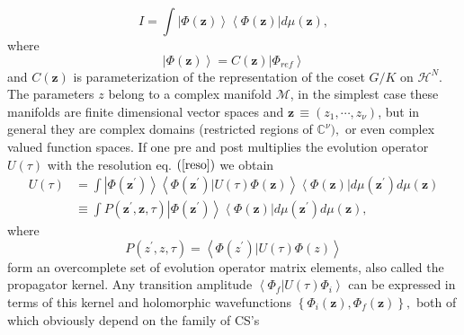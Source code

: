 \documentclass[aps,preprint]{revtex4}%
\begin{document}
\begin{equation}
I=\int\left\vert \Phi\left(  \mathbf{z}\right)  \right\rangle \left\langle
\Phi\left(  \mathbf{z}\right)  \right\vert d\mu\left(  \mathbf{z}\right)  ,
\label{reso}%
\end{equation}
where
\begin{equation}
\left\vert \Phi\left(  \mathbf{z}\right)  \right\rangle =C\left(
\mathbf{z}\right)  \left\vert \Phi_{ref}\right\rangle
\end{equation}
and $C\left(  \mathbf{z}\right)  $ is parameterization of the representation
of the coset $G/K$ on $\mathcal{H}^{N}$. The parameters $z$ belong to a
complex manifold $\mathcal{M}$, in the simplest case these manifolds are
finite dimensional vector spaces and $\mathbf{z}\,\equiv\left(  z_{1}%
,\cdots,z_{\nu}\right)  $, but in general they are complex domains
\cite{domains} (restricted regions of $\mathbb{C}^{\nu}),$ or even complex
valued function spaces. If one pre and post multiplies the evolution operator
$U\left(  \tau\right)  $ with the resolution eq. $\left(  \ref{reso}\right)  $
we obtain
\begin{align}
U\left(  \tau\right)   &  =\int\left\vert \Phi\left(  \mathbf{z}^{\prime
}\right)  \right\rangle \left\langle \Phi\left(  \mathbf{z}^{\prime}\right)
\left\vert U\left(  \tau\right)  \right.  \Phi\left(  \mathbf{z}\right)
\right\rangle \left\langle \Phi\left(  \mathbf{z}\right)  \right\vert
d\mu\left(  \mathbf{z}^{\prime}\right)  d\mu\left(  \mathbf{z}\right)
\nonumber\\
&  \equiv\int P\left(  \mathbf{z}^{\prime},\mathbf{z},\tau\right)  \left\vert
\Phi\left(  \mathbf{z}^{\prime}\right)  \right\rangle \left\langle \Phi\left(
\mathbf{z}\right)  \right\vert d\mu\left(  \mathbf{z}^{\prime}\right)
d\mu\left(  \mathbf{z}\right)  ,
\end{align}
where
\begin{equation}
P\left(  z^{\prime},z,\tau\right)  =\left\langle \Phi\left(  z^{\prime
}\right)  \left\vert U\left(  \tau\right)  \right.  \Phi\left(  z\right)
\right\rangle
\end{equation}
form an overcomplete set of evolution operator matrix elements, also called
the propagator kernel. Any transition amplitude $\left\langle \Phi
_{f}\left\vert U\left(  \tau\right)  \right.  \Phi_{i}\right\rangle $ can be
expressed in terms of this kernel and holomorphic wavefunctions \cite{holo}
$\left\{  \Phi_{i}\left(  \mathbf{z}\right)  ,\Phi_{f}\left(  \mathbf{z}%
\right)  \right\}  ,$ both of which obviously depend on the family of CS's
\end{document}

